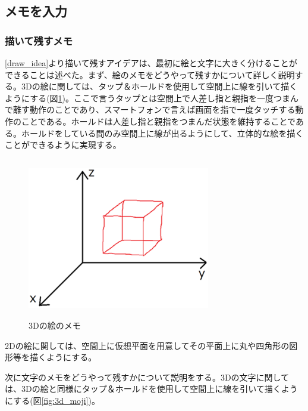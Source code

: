 \documentclass[11pt,a4j, titlepage]{jarticle} %
\begin{document}
\subsection{メモを入力}

\subsubsection{描いて残すメモ} \label{draw_memo}
\ref{draw_idea}より描いて残すアイデアは、最初に絵と文字に大きく分けることができることは述べた。まず、絵のメモをどうやって残すかについて詳しく説明する。3Dの絵に関しては、タップ＆ホールドを使用して空間上に線を引いて描くようにする(図\ref{fig:3d_draw})。ここで言うタップとは空間上で人差し指と親指を一度つまんで離す動作のことであり、スマートフォンで言えば画面を指で一度タッチする動作のことである。ホールドは人差し指と親指をつまんだ状態を維持することである。ホールドをしている間のみ空間上に線が出るようにして、立体的な絵を描くことができるように実現する。

\begin{figure}[H]
  \begin{center}
    \includegraphics[clip,height=7.0cm,width=8.0cm]{./3d_draw.eps}
    \caption{3Dの絵のメモ}
    \label{fig:3d_draw}
  \end{center}
\end{figure}

2Dの絵に関しては、空間上に仮想平面を用意してその平面上に丸や四角形の図形等を描くようにする。

次に文字のメモをどうやって残すかについて説明をする。3Dの文字に関しては、3Dの絵と同様にタップ＆ホールドを使用して空間上に線を引いて描くようにする(図\ref{fig:3d_moji})。
\end{document}
